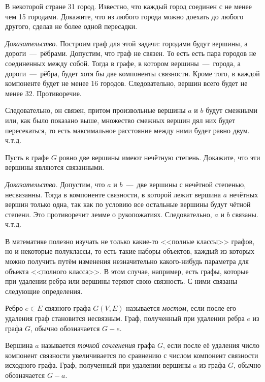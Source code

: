 \begin{example}
	В некоторой стране 31 город. Известно, что каждый город соединен с не менее чем 15 городами. Докажите, что из любого города можно доехать до любого другого, сделав не более одной пересадки.
	
	\emph{Доказательство.} Построим граф для этой задачи: городами будут вершины, а дороги~---~рёбрами. Допустим, что граф не связен. То есть есть пара городов не соединенных между собой. Тогда в графе, в котором вершины~---~города, а дороги~---~рёбра, будет хотя бы две компоненты связности. Кроме того, в каждой компоненте будет не менее 16 городов. Следовательно, вершин всего будет не менее 32. Противоречие. 
	
	Следовательно, он связен, притом произвольные вершины $a$ и $b$ будут смежными или, как было показано выше, множество смежных вершин дял них будет пересекаться, то есть максимальное расстояние между ними будет равно двум. ч.т.д.
\end{example}
	
\begin{statement}
	Пусть в графе $G$ ровно две вершины имеют нечётную степень. Докажите, что эти вершины являются связанными.
	
	\emph{Доказательство.} Допустим, что $a$ и $b$~---~две вершины с нечётной степенью, несвязанны. Тогда в компоненте связности, в которой лежит вершина $a$ нечётных вершин только одна, так как по условию все остальные вершины будут чётной степени. Это противоречит лемме о рукопожатиях. Следовательно, $a$ и $b$ связаны. ч.т.д.
\end{statement}


	В математике полезно изучать не только какие-то <<полные классы>> графов, но и некоторые полуклассы, то есть такие наборы объектов, каждый из которых можно получить путём изменения незначительно какого-нибудь параметра для объекта <<полного класса>>. В этом случае, например, есть графы, которые при удалении ребра или вершины теряют свою связность. С ними связаны следующие определения.

\begin{definition}
	Ребро $e \in E$ связного графа $G(V, E)$ называется \emph{мостом}, если после его удаления граф становится несвязным. Граф, полученный при удалении ребра $e$ из графа $G$, обычно обозначается $G - e$.
\end{definition}

\begin{definition}
	Вершина $a$ называется \emph{точкой сочленения} графа $G$, если после её удаления число компонент связности увеличивается по сравнению с числом компонент связности исходного графа. Граф, полученный при удалении вершины $a$ из графа $G$, обычно обозначается $G - a$.
\end{definition}

